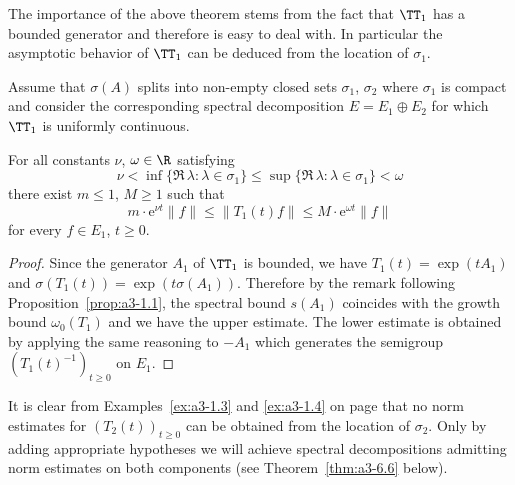 The importance of the above theorem stems from the fact that $\TT_{1}$ has a bounded generator and therefore is easy to deal with.
In particular the asymptotic behavior of $\TT_{1}$ can be deduced from the location of $\sigma_{1}$.
\begin{corollary}\label{cor:a3-3.4}
Assume that $\sigma(A)$ splits into non-empty closed sets $\sigma_{1}$, $\sigma_{2}$ where $\sigma_{1}$ is compact and consider the corresponding spectral decomposition $E = E_{1} \oplus E_{2}$ for which $\TT_{1}$ is uniformly continuous.

For all constants $\nu$, $\omega \in \R$ satisfying
\[
\nu < \inf \{\Re\,\lambda \colon \lambda \in \sigma_{1}\} \leq \sup \{\Re\,\lambda \colon \lambda \in \sigma_{1}\} < \omega
\]
there exist $m \leq 1$, $M \geq 1$ such that
\[
m \cdot \mathrm{e}^{\nu t}\|f\| \leq \|T_{1}(t)f\| \leq M \cdot \mathrm{e}^{\omega t}\|f\|
\]
for every $f \in E_{1}$, $t \geq 0$.
\end{corollary}
\begin{proof}
Since the generator $A_{1}$ of $\TT_{1}$ is bounded, we have $T_{1}(t) = \exp(tA_{1})$ and $\sigma(T_{1}(t)) = \exp(t\sigma(A_{1}))$.
Therefore by the remark following Proposition~\ref{prop:a3-1.1}, the spectral bound $s(A_{1})$ coincides with the growth bound $\omega_{0}(T_{1})$ and we have the upper estimate.
The lower estimate is obtained by applying the same reasoning to $-A_{1}$ which generates the semigroup $(T_{1}(t)^{-1})_{t \geq 0}$ on $E_{1}$.
\end{proof}
It is clear from Examples~\ref{ex:a3-1.3} and \ref{ex:a3-1.4} on page \pageref{ex:a3-1.4} that no norm estimates for $(T_{2}(t))_{t \geq 0}$ can be obtained from the location of $\sigma_{2}$.
Only by adding appropriate hypotheses we will achieve spectral decompositions admitting norm estimates on both components (see Theorem~\ref{thm:a3-6.6} below).


